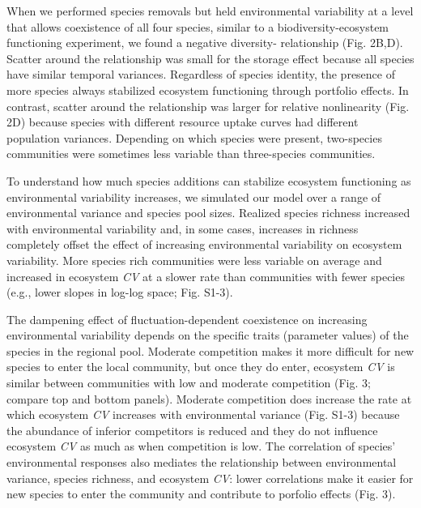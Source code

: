 \documentclass[12pt,]{article}
\begin{document}
When we performed species removals but held environmental variability at
a level that allows coexistence of all four species, similar to a
biodiversity-ecosystem functioning experiment, we found a negative
diversity- relationship (Fig. 2B,D). Scatter
around the relationship was small for the storage effect because all
species have similar temporal variances. Regardless of species identity,
the presence of more species always stabilized ecosystem functioning
through portfolio effects. In contrast, scatter around the relationship
was larger for relative nonlinearity (Fig. 2D) because species with
different resource uptake curves had different population variances.
Depending on which species were present, two-species communities were
sometimes less variable than three-species communities.

To understand how much species additions can stabilize ecosystem
functioning as environmental variability increases, we simulated our
model over a range of environmental variance and species pool sizes.
Realized species richness increased with environmental variability and,
in some cases, increases in richness completely offset the effect of
increasing environmental variability on ecosystem variability. More
species rich communities were less variable on average and increased in
ecosystem \emph{CV} at a slower rate than communities with fewer species
(e.g., lower slopes in log-log space; Fig. S1-3).

The dampening effect of fluctuation-dependent coexistence on increasing
environmental variability depends on the specific traits (parameter
values) of the species in the regional pool. Moderate competition makes
it more difficult for new species to enter the local community, but once
they do enter, ecosystem \emph{CV} is similar between communities with
low and moderate competition (Fig. 3; compare top and bottom panels).
Moderate competition does increase the rate at which ecosystem \emph{CV}
increases with environmental variance (Fig. S1-3) because the abundance
of inferior competitors is reduced and they do not influence ecosystem
\emph{CV} as much as when competition is low. The correlation of
species' environmental responses also mediates the relationship between
environmental variance, species richness, and ecosystem \emph{CV}: lower
correlations make it easier for new species to enter the community and
contribute to porfolio effects (Fig. 3).
\end{document}
